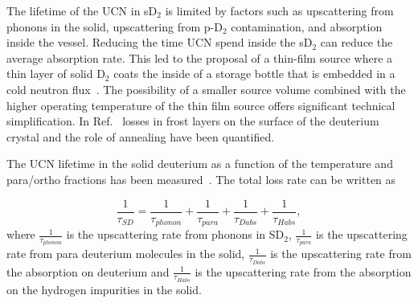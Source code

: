 
The lifetime of the UCN in sD$_2$ is limited by factors such as
upscattering from phonons in the solid, upscattering from p-D$_2$
contamination, and absorption inside the vessel.  Reducing the time
UCN spend inside the sD$_2$ can reduce the average absorption
rate. This led to the proposal of a thin-film source where a thin
layer of solid D$_2$ coats the inside of a storage bottle that is
embedded in a cold neutron flux~\cite{Golub83}. The possibility of a
smaller source volume combined with the higher operating temperature
of the thin film source offers significant technical
simplification. In Ref.~\cite{anghel2018solid} losses in frost layers
on the surface of the deuterium crystal and the role of annealing have
been quantified.

The UCN lifetime in the solid deuterium as a function of the temperature
and para/ortho fractions has been measured~\cite{Morris2002}. The
total loss rate can be written as

\begin{equation}
\label{eqn:SD_lifetime}
\frac{1}{\tau_{SD}}=\frac{1}{\tau_{phonon}}+\frac{1}{\tau_{para}}+\frac{1}{\tau_{Dabs}}+ \frac{1}{\tau_{Habs}},
\end{equation}
where $\frac{1}{\tau_{phonon}}$ is the upscattering rate from phonons
in SD$_2$, $\frac{1}{\tau_{para}}$ is the upscattering rate from para
deuterium molecules in the solid, $\frac{1}{\tau_{Dabs}}$ is the
upscattering rate from the absorption on deuterium and
$\frac{1}{\tau_{Habs}}$ is the upscattering rate from the absorption
on the hydrogen impurities in the solid.



